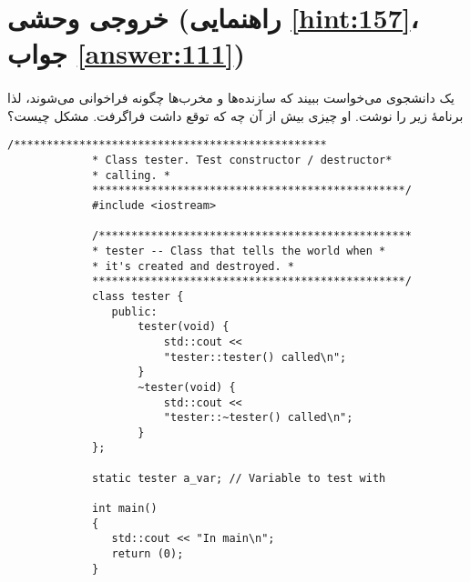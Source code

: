 \section[خروجی وحشی]{خروجی وحشی \protect{} (راهنمایی \ref{hint:157}، جواب \ref{answer:111})}
\paragraph{}\label{prog:83}
یک دانشجوی  می‌خواست ببیند که سازنده‌ها و مخرب‌ها چگونه فراخوانی می‌شوند، لذا برنامهٔ زیر را نوشت. او چیزی بیش از آن چه که توقع داشت فراگرفت. مشکل چیست؟

\begin{LTR}
        \begin{lstlisting}[style=C++Style]
             /************************************************
             * Class tester. Test constructor / destructor*
             * calling. *
             ************************************************/
             #include <iostream>

             /************************************************
             * tester -- Class that tells the world when *
             * it's created and destroyed. *
             ************************************************/
             class tester {
             	public:
             		tester(void) {
             			std::cout <<
             			"tester::tester() called\n";
             		}
             		~tester(void) {
             			std::cout <<
             			"tester::~tester() called\n";
             		}
             };

             static tester a_var; // Variable to test with

             int main()
             {
             	std::cout << "In main\n";
            	return (0);
             }
        \end{lstlisting}
\end{LTR}